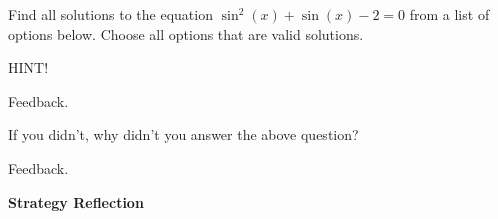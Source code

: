 \documentclass{ximera}
\begin{document}
\begin{problem} 

\begin{problem}
    Find all solutions to the equation $\sin^2(x) + \sin(x) -2 = 0$ from a list of options below.  Choose all options that are valid solutions.
    
    \begin{hint}
    HINT!
    \end{hint}

  \begin{multipleChoice}
      
      \begin{feedback}[attempt]
      Feedback.
      \end{feedback}
      
  \end{multipleChoice}
  
\end{problem}

\begin{question}
  
  If you didn't, why didn't you answer the above question?
  
  \begin{multipleChoice}
      
      \begin{feedback}[attempt]
      Feedback.
      \end{feedback}
  \end{multipleChoice}
  
\end{question}
  
\end{problem}


\begin{center} \textbf{Strategy Reflection}\end{center}
\end{document}
